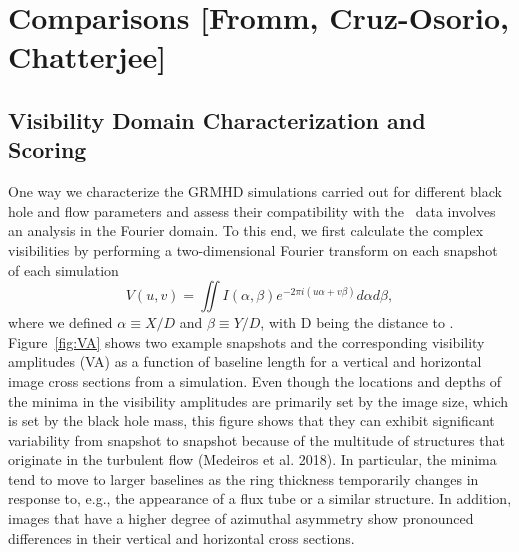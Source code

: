 \documentclass[twocolumn,tighten,dvipsnames,linenumbers]{aastex63}
\begin{document}



\section{Comparisons
  [Fromm, Cruz-Osorio, Chatterjee]}
\label{sec:comparisons}

\subsection{Visibility Domain Characterization and Scoring}

One way we characterize the GRMHD simulations carried out for different
black hole and flow parameters and assess their compatibility
with the \sgra\ data involves an analysis in the Fourier domain. To this
end, we first calculate the complex visibilities by performing a
two-dimensional Fourier transform on each snapshot of each simulation
\begin{equation}
V(u,v) = \iint I(\alpha,\beta) e^{-2\pi i(u\alpha+v\beta)}d\alpha d\beta,
\end{equation}
where we defined $\alpha \equiv X/D$ and $\beta \equiv Y/D$, with D
being the distance to \sgra. Figure~\ref{fig:VA} shows two example
snapshots and the corresponding visibility amplitudes (VA) as a
function of baseline length for a vertical and horizontal image cross
sections from a simulation. Even though the locations and depths of
the minima in the visibility amplitudes are primarily set by the image
size, which is set by the black hole mass, this figure shows that they
can exhibit significant variability from snapshot to snapshot because
of the multitude of structures that originate in the turbulent flow
(Medeiros et al. 2018). In particular, the minima tend to move to
larger baselines as the ring thickness temporarily changes in response
to, e.g., the appearance of a flux tube or a similar structure. In
addition, images that have a higher degree of azimuthal asymmetry show
pronounced differences in their vertical and horizontal cross
sections.
\end{document}
